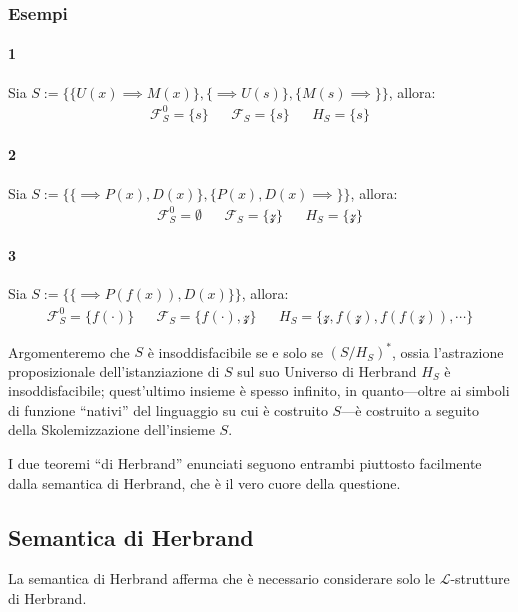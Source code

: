 \subsubsection{Esempi}
\paragraph{1}
Sia $S := \{\{U(x) \implies M(x)\}, \{\implies U(s)\}, \{M(s) \implies\}\}$, allora:
\begin{align*}
\mathscr{F}^0_S = \{s\} &&
\mathscr{F}_S = \{s\} &&
H_S = \{s\}
\end{align*}
\paragraph{2}
Sia $S := \{\{\implies P(x),D(x)\}, \{P(x), D(x) \implies\}\}$, allora: 
\begin{align*}
\mathscr{F}^0_S = \emptyset &&
\mathscr{F}_S = \{\mathcal{z}\} &&
H_S = \{\mathcal{z}\}
\end{align*}
\paragraph{3}
Sia $S := \{\{\implies P(f(x)),D(x)\}\}$, allora: 
\begin{align*}
\mathscr{F}^0_S = \{f(\cdot)\} &&
\mathscr{F}_S = \{f(\cdot),\mathcal{z}\} &&
H_S = \{\mathcal{z}, f(\mathcal{z}), f(f(\mathcal{z})), \cdots\}
\end{align*}

\noindent
Argomenteremo che $S$ è insoddisfacibile se e solo se $(S/H_S)^*$, ossia l'astrazione proposizionale dell'istanziazione di $S$ sul suo Universo di Herbrand $H_S$ è insoddisfacibile; quest'ultimo insieme è spesso infinito, in quanto—oltre ai simboli di funzione ``nativi'' del linguaggio su cui è costruito $S$—è costruito a seguito della Skolemizzazione dell'insieme $S$. 

I due teoremi ``di Herbrand'' enunciati seguono entrambi piuttosto facilmente 
dalla semantica di Herbrand, che è il vero cuore della questione. 

\subsection{Semantica di Herbrand}
La semantica di Herbrand afferma che è necessario considerare solo le 
$\mathscr{L}$-strutture di Herbrand. 

